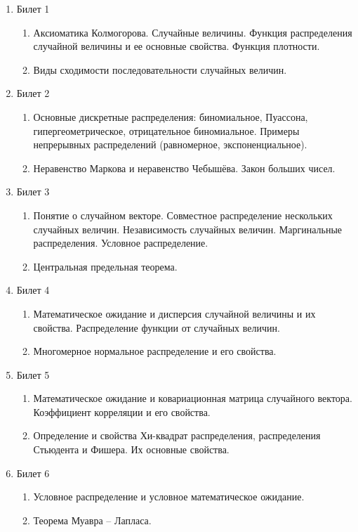 \begin{enumerate}


\item Билет 1
\begin{enumerate}
\item Аксиоматика Колмогорова. Случайные величины. Функция
распределения случайной величины и ее основные свойства. Функция
плотности.
\item Виды сходимости последовательности случайных величин.
\end{enumerate}

\item Билет 2
\begin{enumerate}
\item Основные дискретные распределения: биномиальное, Пуассона,
гипергеометрическое, отрицательное биномиальное. Примеры
непрерывных распределений (равномерное, экспоненциальное).
\item Неравенство Маркова и неравенство Чебышёва. Закон больших чисел.
\end{enumerate}


\item Билет 3
\begin{enumerate}
\item Понятие о случайном векторе. Совместное распределение нескольких
случайных величин. Независимость случайных величин. Маргинальные
распределения. Условное распределение.
\item Центральная предельная теорема.
\end{enumerate}


\item Билет 4
\begin{enumerate}
\item Математическое ожидание и дисперсия случайной величины и их
свойства. Распределение функции от случайных величин.
\item Многомерное нормальное распределение и его свойства.
\end{enumerate}

\item Билет 5
\begin{enumerate}
\item Математическое ожидание и ковариационная матрица случайного
вектора. Коэффициент корреляции и его свойства.
\item Определение и свойства Хи-квадрат распределения, распределения Стьюдента и Фишера. Их основные свойства.
\end{enumerate}

\item Билет 6
\begin{enumerate}
\item Условное распределение и условное математическое ожидание.
\item Теорема Муавра – Лапласа.
\end{enumerate}

\end{enumerate}


